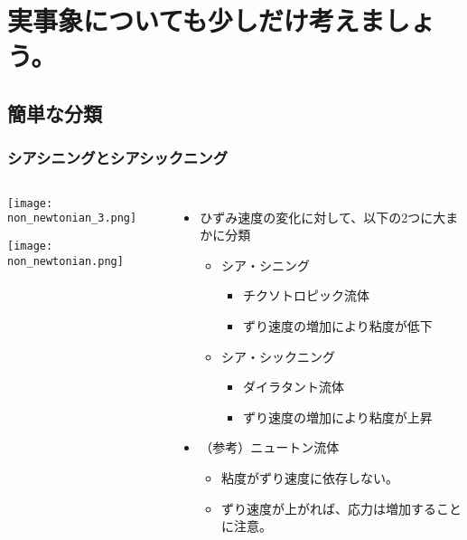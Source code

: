\documentclass[12pt, dvipdfmx]{beamer}
\begin{document}
\section{実事象についても少しだけ考えましょう。}
\subsection{簡単な分類}
\begin{frame}
	\frametitle{シアシニングとシアシックニング}
		\begin{columns}[T, onlytextwidth]
				\begin{center}
					\texttt{[image: non\_newtonian\_3.png]}

					\vspace{10mm}
					\texttt{[image: non\_newtonian.png]}
				\end{center}
				\begin{itemize}
					\item ひずみ速度の変化に対して、以下の2つに大まかに分類
					\begin{itemize}
						\item シア・シニング
						\begin{itemize}
							\item チクソトロピック流体
							\item ずり速度の増加により粘度が低下
						\end{itemize}
						\item シア・シックニング
						\begin{itemize}
							\item ダイラタント流体
							\item ずり速度の増加により粘度が上昇
						\end{itemize}
					\end{itemize}
					\item （参考）ニュートン流体
						\begin{itemize}
							\item 粘度がずり速度に依存しない。
							\item ずり速度が上がれば、応力は増加することに注意。
						\end{itemize}
				\end{itemize}
			\end{columns}
\end{frame}
\end{document}
